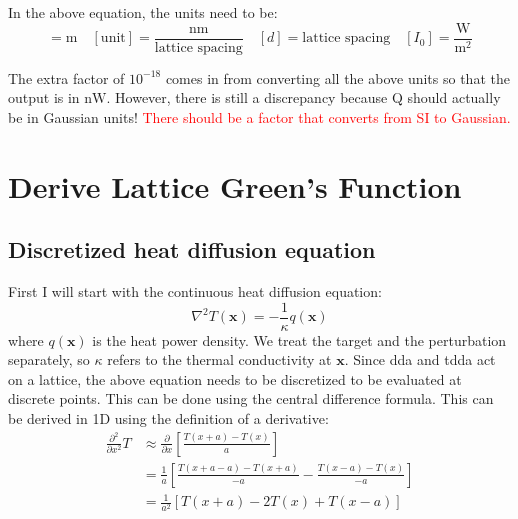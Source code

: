 \documentclass[12pt]{article}
\begin{document}
In the above equation, the units need to be:
\begin{equation} 
[\lambda ] = \textrm{m} \quad [\textrm{unit}] = \frac{\textrm{nm}}{\textrm{lattice spacing}} \quad [d] = \textrm{lattice spacing} \quad [I_0] = \frac{\textrm{W}}{\textrm{m}^2}
\end{equation}

The extra factor of $10^{-18}$ comes in from converting all the above units so that the output is in $\textrm{nW}$. However, there is still a discrepancy because Q should actually be in Gaussian units! \textcolor{red}{There should be a factor that converts from SI to Gaussian.}


\section{Derive Lattice Green's Function}
\subsection{Discretized heat diffusion equation}

First I will start with the continuous heat diffusion equation: 
\begin{equation}
\nabla ^2 T (\textbf{x}) = -\frac{1}{\kappa} q( \textbf{x} )
\end{equation}
where $q( \textbf{x} )$ is the heat power density. We treat the target and the perturbation separately, so $\kappa$ refers to the thermal conductivity at $\textbf{x}$. Since dda and tdda act on a lattice, the above equation needs to be discretized to be evaluated at discrete points. This can be done using the central difference formula. This can be derived in 1D using the definition of a derivative:
\begin{equation}
\begin{split}
\frac{\partial ^2}{\partial x^2} T & \approx \frac{\partial}{\partial x} \left [ \frac{ T( x + a ) - T(x)}{a} \right ] \\
&=  \frac{1}{a} \left [ \frac{T( x + a - a) - T(x + a)}{-a} - \frac{T(x-a) - T(x)}{-a} \right ] \\
&=\frac{1}{a^2} \left [T(x + a) - 2 T(x) + T(x - a) \right ] 
\end{split}
\end{equation} 
\end{document}
